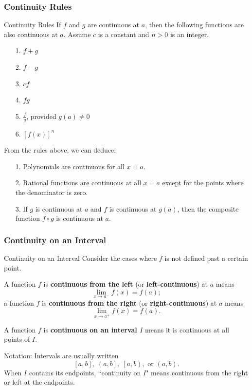 \documentclass[cal1spr16Lectures.tex]{subfiles}
\begin{document}
\subsubsection{Continuity Rules}

\begin{frame}{\small Continuity Rules}
If $f$ and $g$ are continuous at $a$, then the following functions are also continuous at $a$.  Assume $c$ is a constant and $n>0$ is an integer.
\begin{itemize}
\item[1.] $f+g$
\item[2.] $f-g$
\item[3.] $cf$
\item[4.] $fg$
\item[5.] $\frac{f}{g}$, provided $g(a)\ne 0$
\item[6.] $[f(x)]^n$
\end{itemize}
\end{frame}

\begin{frame}
From the rules above, we can deduce:
\begin{itemize}
\item[1.] Polynomials are continuous for all $x=a$.
\item[2.] Rational functions are continuous at all $x=a$ except for the points where the denominator is zero.  
\item[3.] If $g$ is continuous at $a$ and $f$ is continuous at $g(a)$, then the composite function $f \circ g$ is continuous at $a$.
\end{itemize}
\end{frame}

\subsubsection{Continuity on an Interval}

\begin{frame}{\small Continuity on an Interval}\footnotesize 
Consider the cases where $f$ is not defined past a certain point. 
\begin{dfn}
A function $f$ is {\bf continuous from the left} (or {\bf left-continuous}) at $a$ means
\[\lim_{x \to a^-} f(x)=f(a);\]
a function $f$ is {\bf continuous from the right} (or {\bf right-continuous}) at $a$ means
\[\lim_{x \to a^+} f(x)=f(a).\]
\end{dfn}
\end{frame}

\begin{frame}
\begin{dfn} A function $f$ is {\bf continuous on an interval $I$} means it is continuous at all points of $I$. \end{dfn}  
Notation: Intervals are usually written 
\[\left[a,b\right],\;\left(a,b\right],\;\left[a,b\right),\text{ or }\left(a,b\right).\]
When $I$ contains its endpoints, ``continuity on $I$" means continuous from the right or left at the endpoints.
\end{frame}
\end{document}
